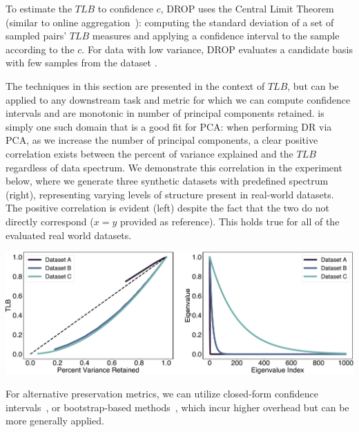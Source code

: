To estimate the $TLB$ to confidence $c$, DROP uses the Central Limit Theorem (similar to online aggregation~\cite{onlineagg}): computing the standard deviation of a set of sampled pairs' $TLB$ measures and applying a confidence interval to the sample according to the $c$.
For data with low variance, DROP evaluates a candidate basis with few samples from the dataset . 

The techniques in this section are presented in the context of $TLB$, but can be applied to any downstream task and metric for which we can compute confidence intervals and are monotonic in number of principal components retained.
 is simply one such domain that is a good fit for PCA: when performing DR via PCA, as we increase the number of principal components, a clear positive correlation exists between the percent of variance explained and the $TLB$ regardless of data spectrum.
We demonstrate this correlation in the experiment below, where we generate three synthetic datasets with predefined spectrum (right), representing varying levels of structure present in real-world datasets. 
The positive correlation is evident (left) despite the fact that the two do not directly correspond ($x=y$ provided as reference). 
This holds true for all of the evaluated real world datasets.

\vspace{.2cm}
\includegraphics[width= .9\linewidth]{figs/tlb-pca.pdf}

For alternative preservation metrics, we can utilize closed-form confidence intervals~\cite{stats-book,ci1,onlineagg}, or bootstrap-based methods~\cite{bootstrap1,bootstrap2}, which incur higher overhead but can be more generally applied.


